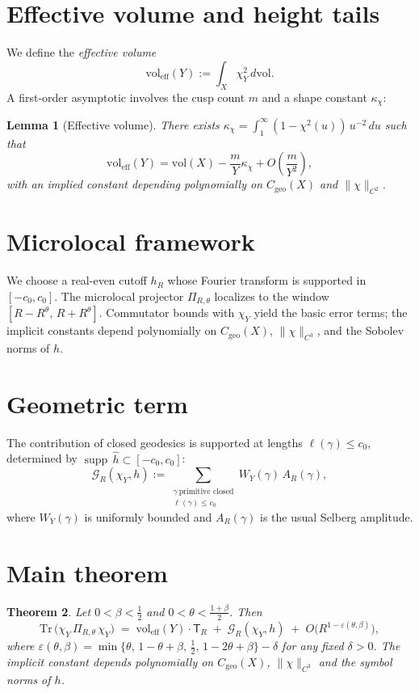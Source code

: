 \documentclass[11pt]{amsart}
\numberwithin{equation}{section}
\newtheorem{theorem}{Theorem}[section]
\newtheorem{lemma}[theorem]{Lemma}
\theoremstyle{definition}
\theoremstyle{remark}
\newcommand{\vol}{\mathrm{vol}}
\DeclareMathOperator{\supp}{supp}
\begin{document}
\section{Effective volume and height tails}\label{sec:volume}
We define the \emph{effective volume}
\[
  \vol_{\mathrm{eff}}(Y):=\int_X \chi_Y^2 \, d\vol.
\]
A first-order asymptotic involves the cusp count $m$ and a shape constant $\kappa_\chi$:
\begin{lemma}[Effective volume]
There exists $\kappa_\chi=\int_{1}^{\infty}(1-\chi^2(u))\,u^{-2}\,du$ such that
\[
  \vol_{\mathrm{eff}}(Y)=\vol(X)-\frac{m}{Y}\kappa_\chi+O\!\left(\frac{m}{Y^2}\right),
\]
with an implied constant depending polynomially on $C_{\mathrm{geo}}(X)$ and $\|\chi\|_{C^2}$.
\end{lemma}

\section{Microlocal framework}\label{sec:micro}
We choose a real-even cutoff $h_R$ whose Fourier transform is supported in
$[-c_0,c_0]$. The microlocal projector $\Pi_{R,\theta}$ localizes to the window
$[R-R^\theta,\,R+R^\theta]$. Commutator bounds with $\chi_Y$ yield the basic error
terms; the implicit constants depend polynomially on $C_{\mathrm{geo}}(X)$, $\|\chi\|_{C^3}$,
and the Sobolev norms of $h$.

\section{Geometric term}\label{sec:geometric}
The contribution of closed geodesics is supported at lengths $\ell(\gamma)\le c_0$,
determined by $\supp\,\widehat{h}\subset[-c_0,c_0]$:
\[
  \mathcal{G}_R(\chi_Y,h)
  :=\sum_{\substack{\gamma\ \text{primitive closed}\\ \ell(\gamma)\le c_0}}
    W_Y(\gamma)\,A_R(\gamma),
\]
where $W_Y(\gamma)$ is uniformly bounded and $A_R(\gamma)$ is the usual Selberg amplitude.

\section{Main theorem}\label{sec:main}
\begin{theorem}
Let $0<\beta<\tfrac12$ and $0<\theta<\tfrac{1+\beta}{2}$. Then
\[
  \mathrm{Tr}\,\Big(\chi_Y\,\Pi_{R,\theta}\,\chi_Y\Big)
  \;=\; \vol_{\mathrm{eff}}(Y)\cdot \mathsf{T}_R \;+\; \mathcal{G}_R(\chi_Y,h)
  \;+\; O\!\big(R^{1-\varepsilon(\theta,\beta)}\big),
\]
where $\varepsilon(\theta,\beta)=\min\{\theta,\,1-\theta+\beta,\,\tfrac12,\,1-2\theta+\beta\}-\delta$ for any fixed $\delta>0$.
The implicit constant depends polynomially on $C_{\mathrm{geo}}(X)$, $\|\chi\|_{C^3}$ and the symbol norms of $h$.
\end{theorem}
\end{document}
